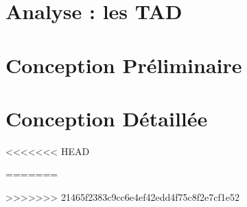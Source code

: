 \documentclass[10pt]{article}
\begin{document}
    \section{Analyse : les TAD}
        
        
        
        
        
        
    \section{Conception Préliminaire}
        
        
        
        
        
        
    \section{Conception Détaillée}
<<<<<<< HEAD
      
       
        
        
        

=======
        
        
>>>>>>> 21465f2383c9cc6e4ef42edd4f75c8f2e7cf1e52
\end{document}
